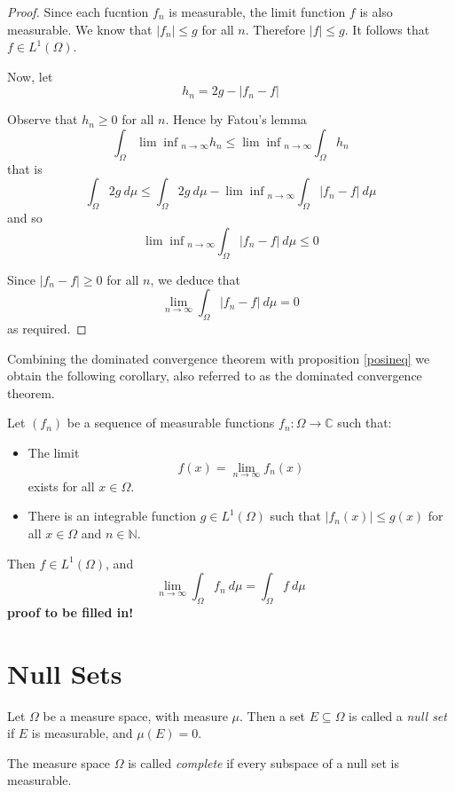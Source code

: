 \begin{proof}
Since each fucntion $f_n$ is measurable, the limit function $f$ is also measurable.  We know that $|f_n|\leq g$ for all $n$.  Therefore $|f|\leq g$.  It follows that $f\in L^1 (\Omega )$.

Now, let
$$h_n = 2g - |f_n -f |$$

Observe that $h_n \geq 0$ for all $n$.  Hence by Fatou's lemma
$$\int_\Omega {\lim \inf}_{n\rightarrow \infty} h_n \leq {\lim \inf}_{n\rightarrow \infty} \int_\Omega h_n$$
that is
$$\int_\Omega 2g\ d\mu \leq \int_\Omega 2g\ d\mu - {\lim \inf}_{n\rightarrow \infty} \int_\Omega |f_n -f| \ d\mu$$
and so
$${\lim \inf}_{n\rightarrow \infty} \int_\Omega |f_n -f| \ d\mu \leq 0$$

Since $|f_n -f | \geq 0$ for all $n$, we deduce that
$$\lim_{n\rightarrow \infty} \int_\Omega |f_n - f|\ d\mu =0$$
as required.
\end{proof}

Combining the dominated convergence theorem with proposition \ref{posineq} we obtain the following corollary, also referred to as the dominated convergence theorem.

\begin{corollary}
Let $(f_n)$ be a sequence of measurable functions $f_n \colon \Omega \rightarrow {\mathbb C}$ such that:

\begin{itemize}

\item The limit
$$f(x) = \lim_{n\rightarrow \infty} f_n (x)$$
exists for all $x\in \Omega$.

\item There is an integrable function $g\in L^1 (\Omega )$ such that $|f_n (x)|\leq g(x)$ for all $x\in \Omega$ and $n\in {\mathbb N}$.

\end{itemize}

Then $f\in L^1 (\Omega )$, and
$$\lim_{n\rightarrow \infty} \int_\Omega f_n \ d\mu = \int_\Omega f\ d\mu$$
\textbf{proof to be filled in!}
\end{corollary}

\section{Null Sets}

\begin{definition}
Let $\Omega$ be a measure space, with measure $\mu$.  Then a set $E\subseteq \Omega$ is called a {\em null set} if $E$ is measurable, and $\mu (E) =0$.

The measure space $\Omega$ is called {\em complete} if every subspace of a null set is measurable.
\end{definition}

